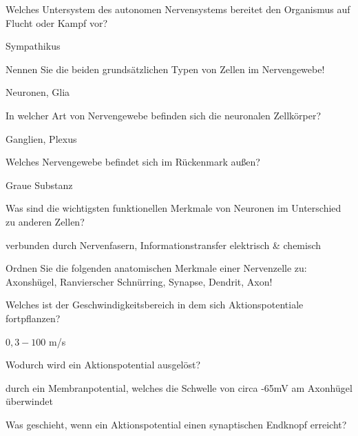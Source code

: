 \documentclass[10pt, a4paper]{exam}
\newcommand\Warning{%
 \makebox[1.4em][c]{%
 \makebox[0pt][c]{\raisebox{.1em}{\small!}}%
 \makebox[0pt][c]{\color{red}\Large$\bigtriangleup$}}}%
\begin{document}
\begin{questions}
  \question Welches Untersystem des autonomen Nervensystems bereitet den Organismus auf Flucht oder Kampf vor?
  \begin{solution}
    Sympathikus
  \end{solution}

  \question Nennen Sie die beiden grundsätzlichen Typen von Zellen im Nervengewebe!
  \begin{solution}
    Neuronen, Glia
  \end{solution}

  \question In welcher Art von Nervengewebe befinden sich die neuronalen Zellkörper?
  \begin{solution}
    Ganglien, Plexus
  \end{solution}

  \question Welches Nervengewebe befindet sich im Rückenmark außen?
  \begin{solution}
    Graue Substanz \Warning
  \end{solution}

  \question Was sind die wichtigsten funktionellen Merkmale von Neuronen im Unterschied zu anderen Zellen?
  \begin{solution}
    verbunden durch Nervenfasern, Informationstransfer elektrisch \& chemisch \Warning
  \end{solution}

  \question Ordnen Sie die folgenden anatomischen Merkmale einer Nervenzelle zu: Axonshügel, Ranvierscher Schnürring, Synapse, Dendrit, Axon!
  \begin{solution}

  \end{solution}

  \question Welches ist der Geschwindigkeitsbereich in dem sich Aktionspotentiale fortpflanzen?
  \begin{solution}
    $0,3 - 100$ m/s
  \end{solution}

  \question Wodurch wird ein Aktionspotential ausgelöst?
  \begin{solution}
    durch ein Membranpotential, welches die Schwelle von circa -65mV am Axonhügel überwindet \Warning
  \end{solution}

  \question Was geschieht, wenn ein Aktionspotential einen synaptischen Endknopf erreicht?
  \begin{solution}

  \end{solution}


\end{questions}
\end{document}
